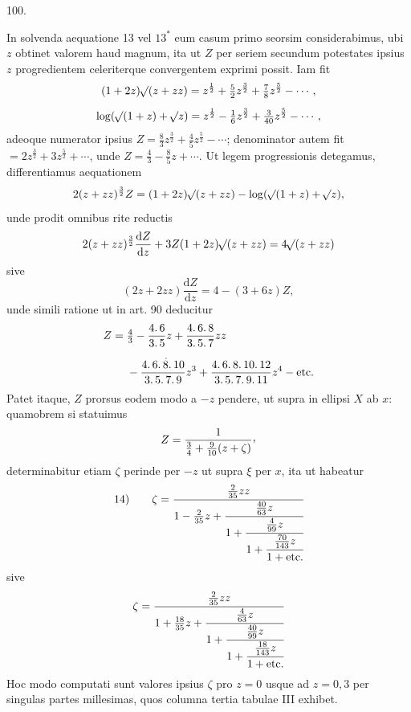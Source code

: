 \par{}\medskip
{}
\begin{center}100.\end{center}
In solvenda aequatione 13 vel $13^*$ eum casum primo seorsim considerabimus, ubi $z$ obtinet valorem haud magnum, ita ut $Z$ per seriem secundum potestates ipsius $z$ progredientem celeriterque convergentem exprimi possit. Iam fit
\[
\begin{gathered}
(1+2z)\mathord{{}^{}\!\surd}(z+zz)=z^{\frac12}+\tfrac52z^{\frac32}+\tfrac78z^{\frac52}-\cdots,\\[.5em]
\log(\mathord{{}^{}\!\surd}(1+z)+\mathord{{}^{}\!\surd}z)=z^{\frac12}-\tfrac16z^{\frac32}+\tfrac3{40}z^{\frac52}-\cdots,
\end{gathered}
\]
\noindent adeoque numerator ipsius $Z=\tfrac83z^{\frac32}+\tfrac45z^{\frac52}-\cdots$; denominator autem fit $=2z^{\frac32}+3z^{\frac52}+\cdots$, unde $Z=\tfrac43-\tfrac85z+\cdots$. Ut legem progressionis detegamus, differentiamus aequationem
\[
2(z+zz)^{\frac32}Z=(1+2z)\mathord{{}^{}\!\surd}(z+zz)-\log(\mathord{{}^{}\!\surd}(1+z)+\mathord{{}^{}\!\surd}z),
\]
\noindent unde prodit omnibus rite reductis
\[
2(z+zz)^{\frac32}\frac{\mathrm dZ}{\mathrm dz}+3Z(1+2z)\mathord{{}^{}\!\surd}(z+zz)=4\mathord{{}^{}\!\surd}(z+zz)
\]
\noindent sive
\[
(2z+2zz)\frac{\mathrm dZ}{\mathrm dz}=4-(3+6z)Z,
\]
\noindent unde simili ratione ut in art. 90 deducitur
\[
\begin{aligned}
Z={}&\tfrac43-\frac{4\mathpunct{.}6}{3\mathpunct{.}5}z+\frac{4\mathpunct{.}6\mathpunct{.}8}{3\mathpunct{.}5\mathpunct{.}7}zz\\[.5em]
&-\frac{4\mathpunct{.}6\mathpunct{.}\overset{\mkern2mu .}{8}\mathpunct{.}10}{3\mathpunct{.}5\mathpunct{.}7\mathpunct{.}9}z^3+\frac{4\mathpunct{.}6\mathpunct{.}8\mathpunct{.}10\mathpunct{.}12}{3\mathpunct{.}5\mathpunct{.}7\mathpunct{.}9\mathpunct{.}11}z^4-\text{etc.}
\end{aligned}
\]
\noindent Patet itaque, $Z$ prorsus eodem modo a $-z$ pendere, ut supra in ellipsi $X$ ab $x$: quamobrem si statuimus
\[
Z=\frac1{\tfrac34+\tfrac9{10}(z+\zeta)}\mathpunct{\raisebox{.45ex}{,}}
\]
\noindent determinabitur etiam $\zeta$ perinde per $-z$ ut supra $\xi$ per $x$, ita ut habeatur
\[
\mathrm{14)}\qquad\zeta=\cfrac{\tfrac2{35}zz}{1-\tfrac2{35}z+\cfrac{\tfrac{40}{63}z}{1+\cfrac{\tfrac4{99}z}{1+\cfrac{\tfrac{70}{143}z}{1+\text{etc.}}}}}
\]
\noindent sive
\[
\zeta=\cfrac{\tfrac2{35}zz}{1+\tfrac{18}{35}z+\cfrac{\tfrac4{63}z}{1+\cfrac{\tfrac{40}{99}z}{1+\cfrac{\tfrac{18}{143}z}{1+\text{etc.}}}}}
\]
\noindent{}Hoc modo computati sunt valores ipsius $\zeta$ pro $z=0$ usque ad $z=0{,}3$ per singulas partes millesimas, quos columna tertia tabulae III exhibet.
